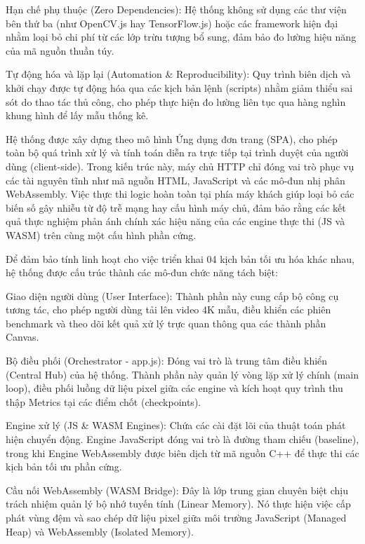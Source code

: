 Hạn chế phụ thuộc (Zero Dependencies): Hệ thống không sử dụng các thư viện bên thứ ba (như OpenCV.js hay TensorFlow.js) hoặc các framework hiện đại nhằm loại bỏ chi phí từ các lớp trừu tượng bổ sung, đảm bảo đo lường hiệu năng của mã nguồn thuần túy.


Tự động hóa và lặp lại (Automation \& Reproducibility): Quy trình biên dịch và khởi chạy được tự động hóa qua các kịch bản lệnh (scripts) nhằm giảm thiểu sai sót do thao tác thủ công, cho phép thực hiện đo lường liên tục qua hàng nghìn khung hình để lấy mẫu thống kê.




Hệ thống được xây dựng theo mô hình Ứng dụng đơn trang (SPA), cho phép toàn bộ quá trình xử lý và tính toán diễn ra trực tiếp tại trình duyệt của người dùng (client-side). Trong kiến trúc này, máy chủ HTTP chỉ đóng vai trò phục vụ các tài nguyên tĩnh như mã nguồn HTML, JavaScript và các mô-đun nhị phân WebAssembly. Việc thực thi logic hoàn toàn tại phía máy khách giúp loại bỏ các biến số gây nhiễu từ độ trễ mạng hay cấu hình máy chủ, đảm bảo rằng các kết quả thực nghiệm phản ánh chính xác hiệu năng của các engine thực thi (JS và WASM) trên cùng một cấu hình phần cứng.



Để đảm bảo tính linh hoạt cho việc triển khai 04 kịch bản tối ưu hóa khác nhau, hệ thống được cấu trúc thành các mô-đun chức năng tách biệt:


Giao diện người dùng (User Interface): Thành phần này cung cấp bộ công cụ tương tác, cho phép người dùng tải lên video 4K mẫu, điều khiển các phiên benchmark và theo dõi kết quả xử lý trực quan thông qua các thành phần Canvas.


Bộ điều phối (Orchestrator - app.js): Đóng vai trò là trung tâm điều khiển (Central Hub) của hệ thống. Thành phần này quản lý vòng lặp xử lý chính (main loop), điều phối luồng dữ liệu pixel giữa các engine và kích hoạt quy trình thu thập Metrics tại các điểm chốt (checkpoints).


Engine xử lý (JS \& WASM Engines): Chứa các cài đặt lõi của thuật toán phát hiện chuyển động. Engine JavaScript đóng vai trò là đường tham chiếu (baseline), trong khi Engine WebAssembly được biên dịch từ mã nguồn C++ để thực thi các kịch bản tối ưu phần cứng.


Cầu nối WebAssembly (WASM Bridge): Đây là lớp trung gian chuyên biệt chịu trách nhiệm quản lý bộ nhớ tuyến tính (Linear Memory). Nó thực hiện việc cấp phát vùng đệm và sao chép dữ liệu pixel giữa môi trường JavaScript (Managed Heap) và WebAssembly (Isolated Memory).


